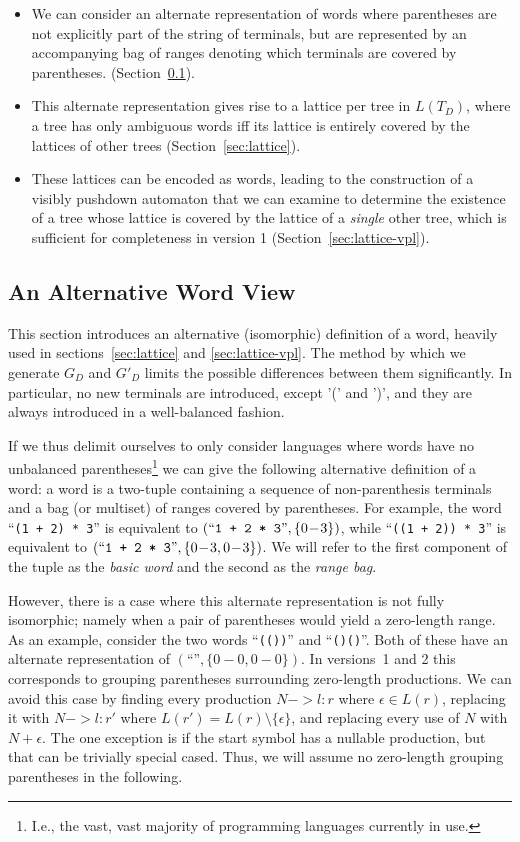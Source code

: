 \documentclass[acmsmall,review,anonymous]{acmart}\settopmatter{printfolios=true,printccs=false,printacmref=false}
\newcommand{\range}[2]{#1\!-\!#2}
\begin{document}
\begin{itemize}
\item We can consider an alternate representation of words where parentheses are not explicitly part of the string of terminals, but are represented by an accompanying bag of ranges denoting which terminals are covered by parentheses. (Section~\ref{sec:word-view}).
\item This alternate representation gives rise to a lattice per tree in $L(T_D)$, where a tree has only ambiguous words iff its lattice is entirely covered by the lattices of other trees (Section~\ref{sec:lattice}).
\item These lattices can be encoded as words, leading to the construction of a visibly pushdown automaton that we can examine to determine the existence of a tree whose lattice is covered by the lattice of a \emph{single} other tree, which is sufficient for completeness in version 1 (Section~\ref{sec:lattice-vpl}).
\end{itemize}

\subsection{An Alternative Word View} \label{sec:word-view}

This section introduces an alternative (isomorphic) definition of a word, heavily used in sections~\ref{sec:lattice} and \ref{sec:lattice-vpl}. The method by which we generate $G_D$ and $G'_D$ limits the possible differences between them significantly. In particular, no new terminals are introduced, except '(' and ')', and they are always introduced in a well-balanced fashion.

If we thus delimit ourselves to only consider languages where words have no unbalanced parentheses\footnote{I.e., the vast, vast majority of programming languages currently in use.} we can give the following alternative definition of a word: a word is a two-tuple containing a sequence of non-parenthesis terminals and a bag (or multiset) of ranges covered by parentheses. For example, the word ``\verb|(1 + 2) * 3|'' is equivalent to $(\text{``}\verb|1 + 2 * 3|\text{''}, \{\range{0}{3}\})$, while ``\verb|((1 + 2)) * 3|'' is equivalent to $(\text{``}\verb|1 + 2 * 3|\text{''}, \{\range{0}{3}, \range{0}{3}\})$. We will refer to the first component of the tuple as the \emph{basic word} and the second as the \emph{range bag}.

However, there is a case where this alternate representation is not fully isomorphic; namely when a pair of parentheses would yield a zero-length range. As an example, consider the two words ``\verb|(())|'' and ``\verb|()()|''. Both of these have an alternate representation of $(\text{``}\text{''}, \{\range{0}{0}, \range{0}{0}\})$. In versions~1 and 2 this corresponds to grouping parentheses surrounding zero-length productions. We can avoid this case by finding every production $N -> l : r$ where $\epsilon \in L(r)$, replacing it with $N -> l : r'$ where $L(r') = L(r) \setminus \{\epsilon\}$, and replacing every use of $N$ with $N + \epsilon$. The one exception is if the start symbol has a nullable production, but that can be trivially special cased. Thus, we will assume no zero-length grouping parentheses in the following.
\end{document}
